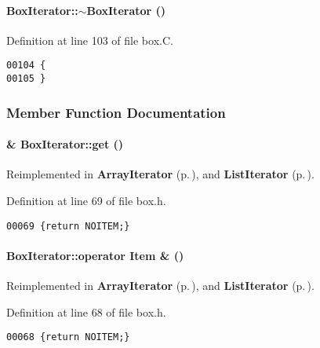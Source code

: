 \paragraph{\setlength{\rightskip}{0pt plus 5cm}Box\-Iterator::$\sim$Box\-Iterator ()\hspace{0.3cm}{\tt  [virtual]}}\hfill



Definition at line 103 of file box.C.\small\begin{verbatim}00104 {
00105 }
\end{verbatim}\normalsize 


\subsubsection{Member Function Documentation}
\label{BoxIterator_a4}
\paragraph{ \& Box\-Iterator::get ()\hspace{0.3cm}{\tt  [inline, virtual]}}\hfill



Reimplemented in {\bf Array\-Iterator} {\rm (p.\,\pageref{ArrayIterator_a4})}, and {\bf List\-Iterator} {\rm (p.\,\pageref{ListIterator_a4})}.

Definition at line 69 of file box.h.\small\begin{verbatim}00069 {return NOITEM;}
\end{verbatim}\normalsize 
\label{BoxIterator_a3}
\paragraph{\setlength{\rightskip}{0pt plus 5cm}Box\-Iterator::operator {\bf Item} \& ()\hspace{0.3cm}{\tt  [inline, virtual]}}\hfill



Reimplemented in {\bf Array\-Iterator} {\rm (p.\,\pageref{ArrayIterator_a3})}, and {\bf List\-Iterator} {\rm (p.\,\pageref{ListIterator_a3})}.

Definition at line 68 of file box.h.\small\begin{verbatim}00068 {return NOITEM;}
\end{verbatim}\normalsize 
\label{BoxIterator_a2}
